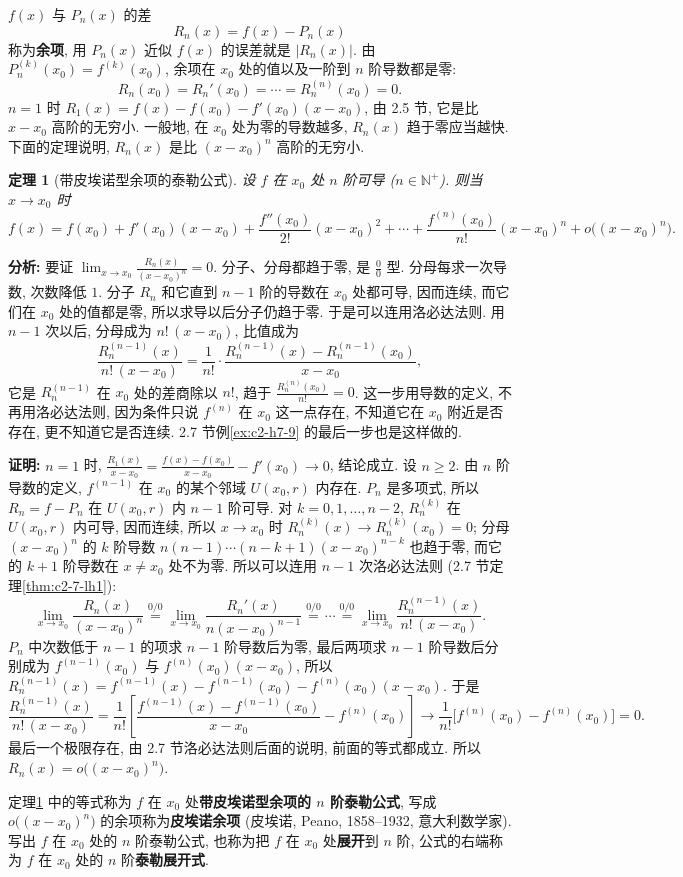 \documentclass[UTF8,openany]{ctexbook}
\theoremstyle{chinesetextbook}
\newtheorem{theorem}{定理}[section]
\newenvironment{cnproof}{\par\indent\textbf{证明:} \ignorespaces}{\par}
\begin{document}
$f(x)$ 与 $P_n(x)$ 的差
\[
R_n(x)=f(x)-P_n(x)
\]
称为\textbf{余项}, 用 $P_n(x)$ 近似 $f(x)$ 的误差就是 $|R_n(x)|$. 由 $P_n^{(k)}(x_0)=f^{(k)}(x_0)$, 余项在 $x_0$ 处的值以及一阶到 $n$ 阶导数都是零:
\[
R_n(x_0)=R_n'(x_0)=\cdots=R_n^{(n)}(x_0)=0.
\]
$n=1$ 时 $R_1(x)=f(x)-f(x_0)-f'(x_0)(x-x_0)$, 由 2.5 节, 它是比 $x-x_0$ 高阶的无穷小. 一般地, 在 $x_0$ 处为零的导数越多, $R_n(x)$ 趋于零应当越快. 下面的定理说明, $R_n(x)$ 是比 $(x-x_0)^n$ 高阶的无穷小.
\begin{theorem}[带皮埃诺型余项的泰勒公式]\label{thm:c2-8-peano}
设 $f$ 在 $x_0$ 处 $n$ 阶可导 ($n\in\mathbb N^+$). 则当 $x\to x_0$ 时
\[
f(x)=f(x_0)+f'(x_0)(x-x_0)+\frac{f''(x_0)}{2!}(x-x_0)^2+\cdots+\frac{f^{(n)}(x_0)}{n!}(x-x_0)^n+o\bigl((x-x_0)^n\bigr).
\]
\end{theorem}
\par\indent\textbf{分析:} 要证 $\displaystyle\lim_{x\to x_0}\frac{R_n(x)}{(x-x_0)^n}=0$. 分子、分母都趋于零, 是 $\displaystyle\frac00$ 型. 分母每求一次导数, 次数降低 $1$. 分子 $R_n$ 和它直到 $n-1$ 阶的导数在 $x_0$ 处都可导, 因而连续, 而它们在 $x_0$ 处的值都是零, 所以求导以后分子仍趋于零. 于是可以连用洛必达法则. 用 $n-1$ 次以后, 分母成为 $n!\,(x-x_0)$, 比值成为
\[
\frac{R_n^{(n-1)}(x)}{n!\,(x-x_0)}=\frac1{n!}\cdot\frac{R_n^{(n-1)}(x)-R_n^{(n-1)}(x_0)}{x-x_0},
\]
它是 $R_n^{(n-1)}$ 在 $x_0$ 处的差商除以 $n!$, 趋于 $\displaystyle\frac{R_n^{(n)}(x_0)}{n!}=0$. 这一步用导数的定义, 不再用洛必达法则, 因为条件只说 $f^{(n)}$ 在 $x_0$ 这一点存在, 不知道它在 $x_0$ 附近是否存在, 更不知道它是否连续. 2.7 节例\ref{ex:c2-h7-9} 的最后一步也是这样做的.
\begin{cnproof}
$n=1$ 时, $\displaystyle\frac{R_1(x)}{x-x_0}=\frac{f(x)-f(x_0)}{x-x_0}-f'(x_0)\to0$, 结论成立. 设 $n\ge2$. 由 $n$ 阶导数的定义, $f^{(n-1)}$ 在 $x_0$ 的某个邻域 $U(x_0,r)$ 内存在. $P_n$ 是多项式, 所以 $R_n=f-P_n$ 在 $U(x_0,r)$ 内 $n-1$ 阶可导. 对 $k=0,1,\ldots,n-2$, $R_n^{(k)}$ 在 $U(x_0,r)$ 内可导, 因而连续, 所以 $x\to x_0$ 时 $R_n^{(k)}(x)\to R_n^{(k)}(x_0)=0$; 分母 $(x-x_0)^n$ 的 $k$ 阶导数 $n(n-1)\cdots(n-k+1)(x-x_0)^{n-k}$ 也趋于零, 而它的 $k+1$ 阶导数在 $x\ne x_0$ 处不为零. 所以可以连用 $n-1$ 次洛必达法则 (2.7 节定理\ref{thm:c2-7-lh1}):
\[
\lim_{x\to x_0}\frac{R_n(x)}{(x-x_0)^n}\overset{0/0}{=}\lim_{x\to x_0}\frac{R_n'(x)}{n(x-x_0)^{n-1}}\overset{0/0}{=}\cdots\overset{0/0}{=}\lim_{x\to x_0}\frac{R_n^{(n-1)}(x)}{n!\,(x-x_0)}.
\]
$P_n$ 中次数低于 $n-1$ 的项求 $n-1$ 阶导数后为零, 最后两项求 $n-1$ 阶导数后分别成为 $f^{(n-1)}(x_0)$ 与 $f^{(n)}(x_0)(x-x_0)$, 所以 $R_n^{(n-1)}(x)=f^{(n-1)}(x)-f^{(n-1)}(x_0)-f^{(n)}(x_0)(x-x_0)$. 于是
\[
\frac{R_n^{(n-1)}(x)}{n!\,(x-x_0)}=\frac1{n!}\left[\frac{f^{(n-1)}(x)-f^{(n-1)}(x_0)}{x-x_0}-f^{(n)}(x_0)\right]\to\frac1{n!}\bigl[f^{(n)}(x_0)-f^{(n)}(x_0)\bigr]=0.
\]
最后一个极限存在, 由 2.7 节洛必达法则后面的说明, 前面的等式都成立. 所以 $R_n(x)=o\bigl((x-x_0)^n\bigr)$.
\end{cnproof}
定理\ref{thm:c2-8-peano} 中的等式称为 $f$ 在 $x_0$ 处\textbf{带皮埃诺型余项的 $n$ 阶泰勒公式}, 写成 $o\bigl((x-x_0)^n\bigr)$ 的余项称为\textbf{皮埃诺余项} (皮埃诺, Peano, 1858--1932, 意大利数学家). 写出 $f$ 在 $x_0$ 处的 $n$ 阶泰勒公式, 也称为把 $f$ 在 $x_0$ 处\textbf{展开}到 $n$ 阶, 公式的右端称为 $f$ 在 $x_0$ 处的 $n$ 阶\textbf{泰勒展开式}.
\end{document}
